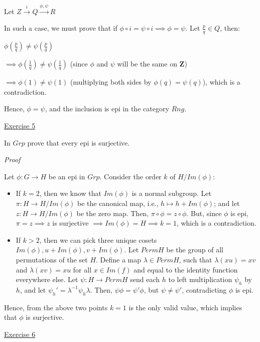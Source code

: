 \documentclass[11pt]{article}
\begin{document}
Let $Z \xrightarrow{i} Q \xrightarrow{\phi, \psi} R$

In such a case, we must prove that if $\phi \circ i = \psi \circ i \implies \phi = \psi$. Let $\frac{p}{q} \in Q $, then:

$\phi(\frac{p}{q}) \neq \psi(\frac{p}{q})$ 

$\implies \phi(\frac{1}{q}) \neq \psi(\frac{1}{q})$ (since $\phi$ and $\psi$ will be the same on $\mathbf{Z}$)

$\implies \phi(1) \neq \psi(1)$ (multiplying both sides by $\phi(q) = \psi(q)$), which is a contradiction.

Hence, $\phi = \psi$, and the inclusion is epi in the category $Rng$.

\vspace{2mm}
\noindent
\underline{Exercise 5}
\vspace{2mm}

In $Grp$ prove that every epi is surjective.

\vspace{2mm}
\noindent
\emph{Proof}

Let $\phi : G \to H$ be an epi in $Grp$. Consider the order $k$ of $H / Im(\phi)$:

\begin{itemize}
	\item If $k = 2$, then we know that $Im(\phi)$ is a normal subgroup. Let $\pi : H \to H / Im(\phi)$ be the canonical map, i.e., $h \mapsto h + Im(\phi)$; and let $z : H \to H / Im(\phi)$ be the zero map. Then, $\pi \circ \phi = z \circ \phi$. But, since $\phi$ is epi, $\pi = z \implies z$ is surjective $\implies Im(\phi) = H \implies k = 1$, which is a contradiction.
	\item If $k > 2$, then we can pick three unique cosets $Im(\phi), u + Im(\phi), v + Im(\phi)$. Let $Perm H$ be the group of all permutations of the set $H$. Define a map $\lambda \in Perm H$, such that $\lambda (xu) = xv$ and $\lambda (xv) = xu$ for all $x \in Im(f)$ and equal to the identity function everywhere else. Let $\psi: H \to Perm H$ send each $h$ to left multiplication $\psi_h$ by $h$, and let $\psi_{h}' = \lambda^{-1} \psi_h \lambda$. Then, $\psi \phi = \psi' \phi$, but $\psi \neq \psi'$, contradicting $\phi$ is epi.
\end{itemize}

Hence, from the above two points $k = 1$ is the only valid value, which implies that $\phi$ is surjective.


\vspace{2mm}
\noindent
\underline{Exercise 6}
\vspace{2mm}
\end{document}
